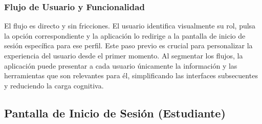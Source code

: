 \begin{samepage}
    \subsubsection*{Flujo de Usuario y Funcionalidad}
    El flujo es directo y sin fricciones. El usuario identifica visualmente su rol, pulsa la opción correspondiente y la aplicación lo redirige a la pantalla de inicio de sesión específica para ese perfil. Este paso previo es crucial para personalizar la experiencia del usuario desde el primer momento. Al segmentar los flujos, la aplicación puede presentar a cada usuario únicamente la información y las herramientas que son relevantes para él, simplificando las interfaces subsecuentes y reduciendo la carga cognitiva.
\normalsize\end{samepage}
\clearpage

\subsection{ Pantalla de Inicio de Sesión (Estudiante)}
